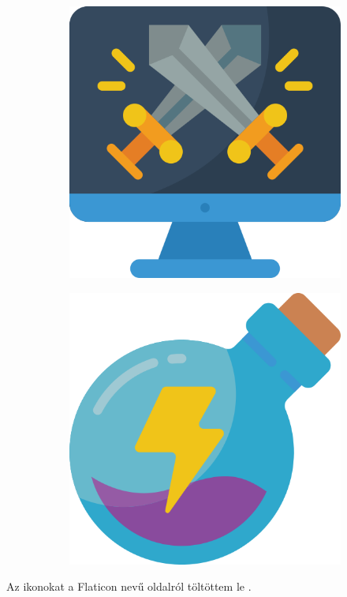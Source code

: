\begin{figure}[h]
\begin{subfigure}{.1\textwidth}
        \includegraphics[width=.8\linewidth]{images/icons/057-computer.png}
    \end{subfigure}
    \begin{subfigure}{.1\textwidth}
        \centering
        \includegraphics[width=.8\linewidth]{images/icons/058-potion.png}
    \end{subfigure}
\end{figure}

Az ikonokat a Flaticon nevű oldalról töltöttem le \cite{competitiveGamingIcon}.

